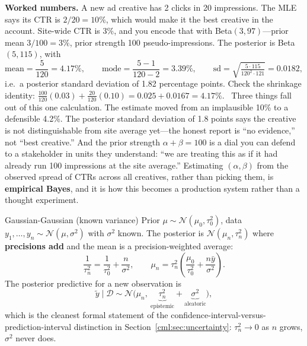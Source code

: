 \textbf{Worked numbers.} A new ad creative has 2 clicks in 20 impressions. The MLE says its CTR is $2/20 = 10\%$, which would make it the best creative in the account. Site-wide CTR is 3\%, and you encode that with Beta$(3, 97)$---prior mean $3/100 = 3\%$, prior strength 100 pseudo-impressions. The posterior is Beta$(5, 115)$, with
\begin{equation*}
\text{mean} = \frac{5}{120} = 4.17\%, \qquad \text{mode} = \frac{5-1}{120-2} = 3.39\%, \qquad \text{sd} = \sqrt{\tfrac{5 \cdot 115}{120^2 \cdot 121}} = 0.0182 ,
\end{equation*}
i.e.\ a posterior standard deviation of 1.82 percentage points. Check the shrinkage identity: $\tfrac{100}{120}(0.03) + \tfrac{20}{120}(0.10) = 0.025 + 0.0167 = 4.17\%$. \checkmark\ Three things fall out of this one calculation. The estimate moved from an implausible 10\% to a defensible 4.2\%. The posterior standard deviation of 1.8 points says the creative is not distinguishable from site average yet---the honest report is ``no evidence,'' not ``best creative.'' And the prior strength $\alpha+\beta = 100$ is a dial you can defend to a stakeholder in units they understand: ``we are treating this as if it had already run 100 impressions at the site average.'' Estimating $(\alpha,\beta)$ from the observed spread of CTRs across all creatives, rather than picking them, is \textbf{empirical Bayes}, and it is how this becomes a production system rather than a thought experiment.

\begin{mathresult}{Gaussian-Gaussian (known variance)}
Prior $\mu \sim \mathcal{N}(\mu_0, \tau_0^2)$, data $y_1,\dots,y_n \sim \mathcal{N}(\mu, \sigma^2)$ with $\sigma^2$ known. The posterior is $\mathcal{N}(\mu_n, \tau_n^2)$ where \textbf{precisions add} and the mean is a precision-weighted average:
\begin{equation}
\frac{1}{\tau_n^2} = \frac{1}{\tau_0^2} + \frac{n}{\sigma^2}, \qquad
\mu_n = \tau_n^2\left(\frac{\mu_0}{\tau_0^2} + \frac{n\bar y}{\sigma^2}\right).
\end{equation}
The posterior predictive for a new observation is
\begin{equation}
\tilde y \mid \mathcal{D} \sim \mathcal{N}\big(\mu_n,\ \underbrace{\tau_n^2}_{\text{epistemic}} + \underbrace{\sigma^2}_{\text{aleatoric}}\big),
\end{equation}
which is the cleanest formal statement of the confidence-interval-versus-prediction-interval distinction in Section~\ref{cml:sec:uncertainty}: $\tau_n^2 \to 0$ as $n$ grows, $\sigma^2$ never does.
\end{mathresult}

